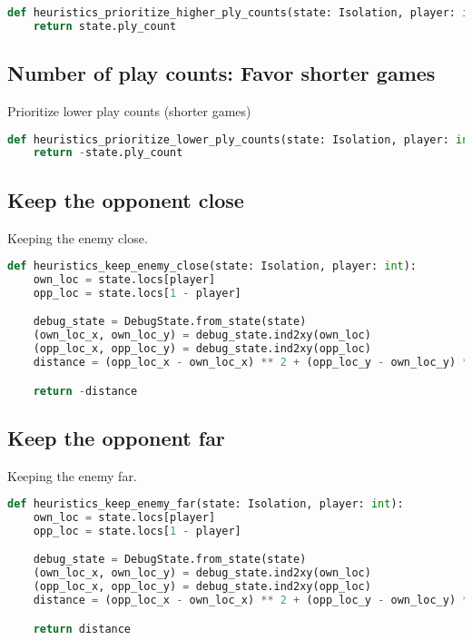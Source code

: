 \documentclass[aps,prd,notitlepage,floatfix,superscriptaddress,groupedaddress,nofootinbib]{revtex4-1}
\begin{document}
\begin{lstlisting}[language=python]
def heuristics_prioritize_higher_ply_counts(state: Isolation, player: int):
    return state.ply_count
\end{lstlisting}

\subsection*{Number of play counts: Favor shorter games}
Prioritize lower play counts (shorter games)

\begin{lstlisting}[language=python]
def heuristics_prioritize_lower_ply_counts(state: Isolation, player: int):
    return -state.ply_count
\end{lstlisting}

\subsection*{Keep the opponent close}
Keeping the enemy close.

\begin{lstlisting}[language=python]
def heuristics_keep_enemy_close(state: Isolation, player: int):
    own_loc = state.locs[player]
    opp_loc = state.locs[1 - player]

    debug_state = DebugState.from_state(state)
    (own_loc_x, own_loc_y) = debug_state.ind2xy(own_loc)
    (opp_loc_x, opp_loc_y) = debug_state.ind2xy(opp_loc)
    distance = (opp_loc_x - own_loc_x) ** 2 + (opp_loc_y - own_loc_y) ** 2

    return -distance
\end{lstlisting}

\subsection*{Keep the opponent far}
Keeping the enemy far.

\begin{lstlisting}[language=python]
def heuristics_keep_enemy_far(state: Isolation, player: int):
    own_loc = state.locs[player]
    opp_loc = state.locs[1 - player]

    debug_state = DebugState.from_state(state)
    (own_loc_x, own_loc_y) = debug_state.ind2xy(own_loc)
    (opp_loc_x, opp_loc_y) = debug_state.ind2xy(opp_loc)
    distance = (opp_loc_x - own_loc_x) ** 2 + (opp_loc_y - own_loc_y) ** 2

    return distance
\end{lstlisting}
\end{document}
